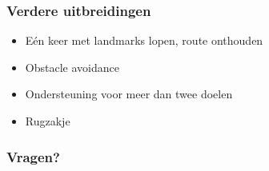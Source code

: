 \documentclass[]{beamerruhuisstijl}
\begin{document}
\begin{frame}
  \frametitle{Verdere uitbreidingen}
  \begin{itemize}
    \item Eén keer met landmarks lopen, route onthouden
    \item Obstacle avoidance
    \item Ondersteuning voor meer dan twee doelen
    \item Rugzakje
  \end{itemize}
\end{frame}

\begin{frame}
  \frametitle{Vragen?}
\end{frame}
\end{document}
